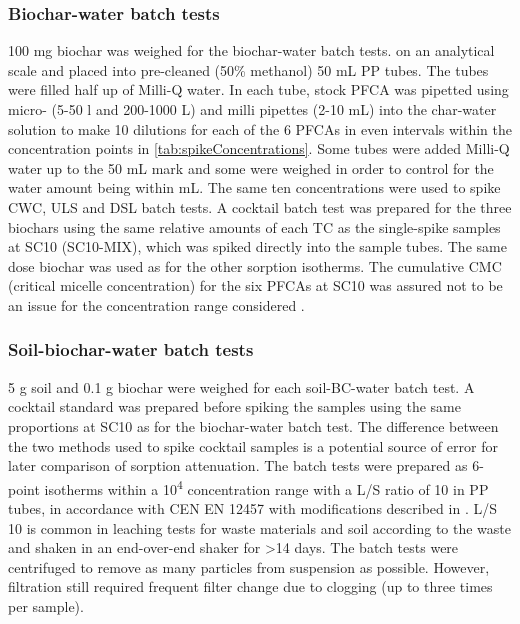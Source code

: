 \subsubsection{Biochar-water batch tests}
100 mg biochar was weighed for the biochar-water batch tests. on an analytical scale and placed into pre-cleaned (50\% methanol) 50 mL PP tubes. The tubes were filled half up of Milli-Q water. In each tube, stock PFCA was pipetted using micro- (5-50 {\textmu}l and 200-1000 {\textmu}L) and milli pipettes (2-10 mL) into the char-water solution to make 10 dilutions for each of the 6 PFCAs in even intervals within the concentration points in \cref{tab:spikeConcentrations}. Some tubes were added Milli-Q water up to the 50 mL mark and some were weighed in order to control for the water amount being within  mL. The same ten concentrations were used to spike CWC, ULS and DSL batch tests. A cocktail batch test was prepared for the three biochars using the same relative amounts of each TC as the single-spike samples at SC10 (SC10-MIX), which was spiked directly into the sample tubes. The same dose biochar was used as for the other sorption isotherms. The cumulative CMC (critical micelle concentration) for the six PFCAs at SC10 was assured not to be an issue for the concentration range considered \citep{bhhatarai2011,ding2013physicochemical}.

\subsubsection{Soil-biochar-water batch tests}\label{sec:S-BC}
5 g soil and 0.1 g biochar were weighed for each soil-BC-water batch test. A cocktail standard was prepared before spiking the samples using the same proportions at SC10 as for the biochar-water batch test. The difference between the two methods used to spike cocktail samples is a potential source of error for later comparison of sorption attenuation. 
The batch tests were prepared as 6-point isotherms within a 10\textsuperscript{4} concentration range with a L/S ratio of 10 in PP tubes, in accordance with CEN EN 12457 with modifications described in \citep{Hale2017fire,Kupryianchyk2016a}. L/S 10  is common in leaching tests for waste materials and soil according to the waste and shaken in an end-over-end shaker for \textgreater 14 days. The batch tests were centrifuged to remove as many particles from suspension as possible. However, filtration still required frequent filter change due to clogging (up to three times per sample).

